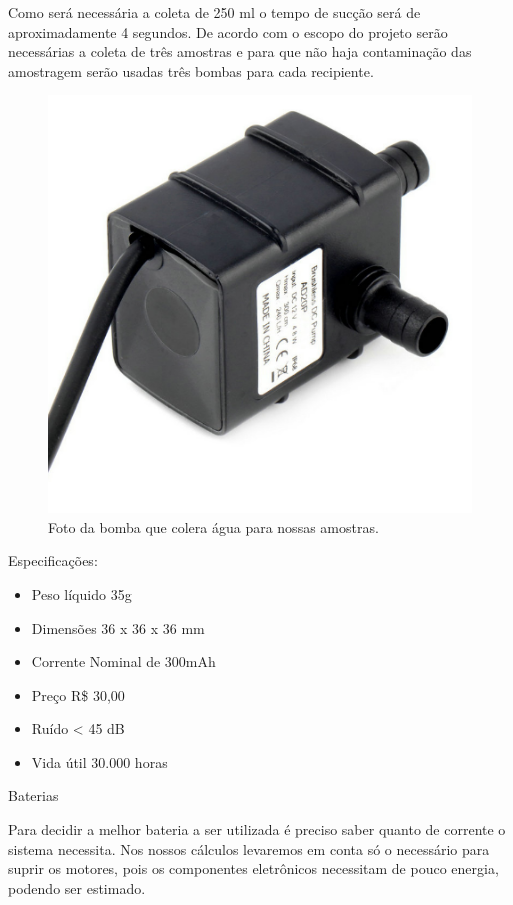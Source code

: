 Como será necessária a coleta de 250 ml o tempo de sucção será de aproximadamente 4 segundos. De acordo com o escopo do projeto serão necessárias a coleta de três amostras e para que não haja contaminação das amostragem serão usadas três bombas para cada recipiente.

\FloatBarrier
\begin{figure} [!htp]
	\centering
	\includegraphics[scale=0.6]{figuras/bombaagua}
	\caption{Foto da bomba que colera água para nossas amostras.}
	\label{bombaagua}
\end{figure}
\FloatBarrier

Especificações:
\begin{itemize}
    \item Peso líquido 35g
    \item Dimensões  36 x 36 x 36 mm
    \item Corrente Nominal de 300mAh
    \item Preço R\$ 30,00
    \item Ruído < 45 dB
    \item Vida útil 30.000 horas
\end{itemize}


Baterias 

Para decidir a melhor bateria a ser utilizada é preciso saber quanto de corrente o sistema necessita. Nos nossos cálculos levaremos em conta só o necessário para suprir os motores, pois os componentes eletrônicos necessitam de pouco energia, podendo ser estimado.  

